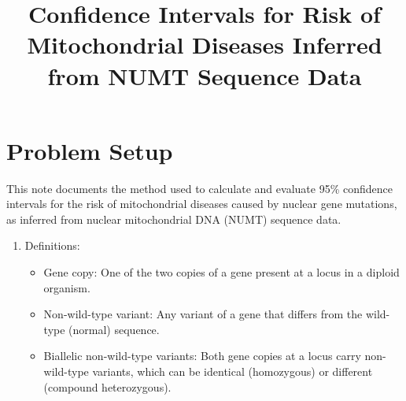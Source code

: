 \documentclass{article}
\title{Confidence Intervals for Risk of Mitochondrial Diseases Inferred from NUMT Sequence Data}
\date{}
\begin{document}
\maketitle

\section*{Problem Setup}
This note documents the method used to calculate and evaluate 95\% confidence intervals for the risk of mitochondrial diseases caused by nuclear gene mutations, as inferred from nuclear mitochondrial DNA (NUMT) sequence data.

\begin{enumerate}

\item Definitions:
\begin{itemize}
    \item Gene copy: One of the two copies of a gene present at a locus in a diploid organism.
    \item Non-wild-type variant: Any variant of a gene that differs from the wild-type (normal) sequence.
    \item Biallelic non-wild-type variants: Both gene copies at a locus carry non-wild-type variants, which can be identical (homozygous) or different (compound heterozygous).
\end{itemize}


\end{enumerate}
\end{document}

